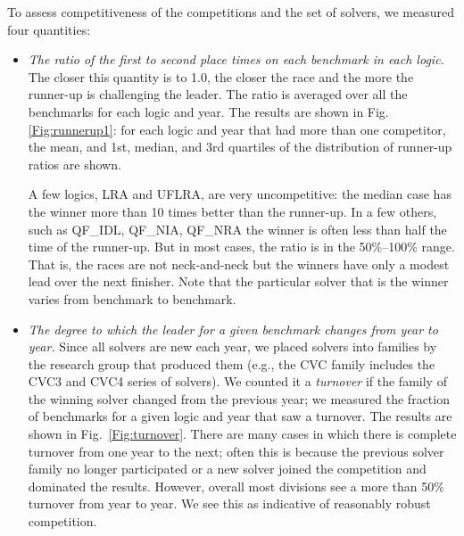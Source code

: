 \documentclass[smallcondensed]{svjour3}
\begin{document}
To assess competitiveness of the competitions and the set of solvers, we measured four quantities:
\begin{itemize}
\item {\em The ratio of the first to second place times on each benchmark in each logic.} The closer this quantity is to 1.0, the closer the race and the more the runner-up is challenging the leader. The ratio is averaged over all the benchmarks for each logic and year. The results are shown in Fig. \ref{Fig:runnerup1}: for each logic and year that had more than one competitor, the mean, and 1st, median, and 3rd quartiles of the distribution of runner-up ratios are shown. 

A few logics, LRA and UFLRA, are very uncompetitive: the median case has the winner more than 10 times better than the runner-up. In a few others, such as QF\_IDL, QF\_NIA, QF\_NRA the winner is often less than half the time of the runner-up. But in most cases, the ratio is in the 50\%--100\% range. That is, the races are not neck-and-neck but the winners have only a modest lead over the next finisher. Note that the particular solver that is the winner varies from benchmark to benchmark.

\item {\em The degree to which the leader for a given benchmark changes from year to year.} Since all solvers are new each year, we placed solvers into families by the research group that produced them (e.g., the CVC family includes the CVC3 and CVC4 series of solvers). We counted it a {\em turnover} if the family of the winning solver changed from the previous year; we measured the fraction of benchmarks for a given logic and year that saw a turnover. The results are shown in 
Fig.~\ref{Fig:turnover}. There are many cases in which there is complete turnover from one year to the next; often this is because the previous solver family no longer participated or a new solver joined the competition and dominated the results. However, overall most
divisions see a more than 50\% turnover from year to year. We see this as indicative of reasonably robust competition.




\end{itemize}
\end{document}
